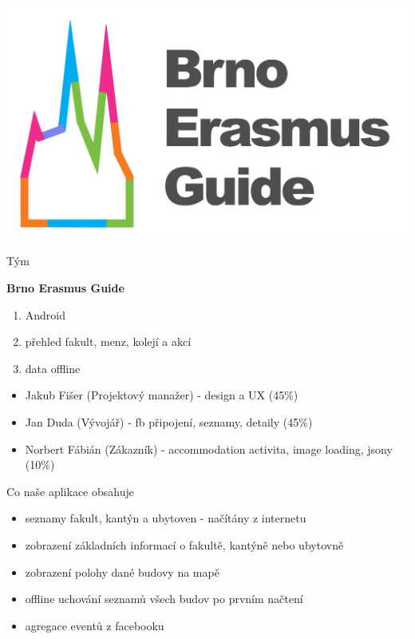 \documentclass[pdf]{beamer}
\begin{document}
\begin{frame}
  \begin{center}
    \includegraphics[scale=0.13]{app_menu_header}
  \end{center}
\end{frame}

\begin{frame}{Tým}
  \begin{minipage}{\textwidth}
    \textbf{Brno Erasmus Guide}
    \begin{enumerate}
      \item Android    
      \item přehled fakult, menz, kolejí a akcí
      \item data offline
    \end{enumerate}
    \vspace{2\baselineskip}
  \end{minipage}
  \begin{minipage}{\textwidth}
    \begin{itemize}
      \item Jakub Fišer (Projektový manažer) - design a UX (45\%)
      \item Jan Duda (Vývojář) - fb připojení, seznamy, detaily (45\%)
      \item Norbert Fábián (Zákazník) - accommodation activita, image loading, jsony (10\%)
    \end{itemize}  
  \end{minipage}
\end{frame}

\begin{frame}{Co naše aplikace obsahuje}  
 \begin{itemize}
   \item seznamy fakult, kantýn a ubytoven - načítány z internetu
   \item zobrazení základních informací o fakultě, kantýně nebo ubytovně
   \item zobrazení polohy dané budovy na mapě
   \item offline uchování seznamů všech budov po prvním načtení
   \item agregace eventů z facebooku
 \end{itemize}  
\end{frame}
\end{document}
